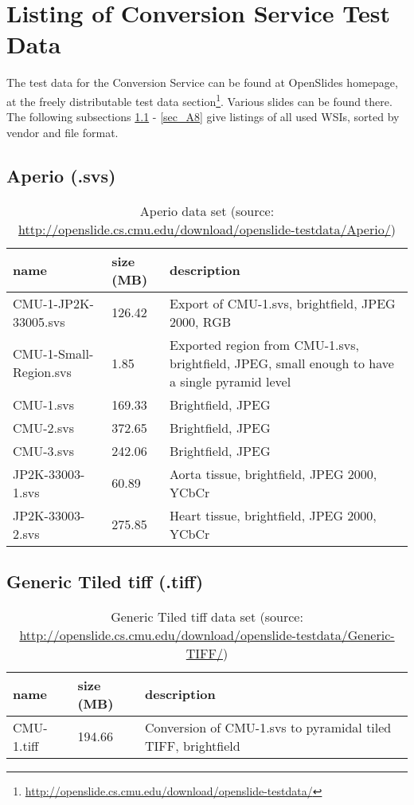 \chapter{Listing of Conversion Service Test Data}

The test data for the Conversion Service can be found at OpenSlides homepage, at the freely distributable test data section\footnote{\url{http://openslide.cs.cmu.edu/download/openslide-testdata/}}. Various slides can be found there. The following subsections \ref{sec_A1} - \ref{sec_A8} give listings of all used WSIs, sorted by vendor and file format.

\section{Aperio (.svs)}
\label{sec_A1}

\begin{table}[H]
	\begin{center}
		\begin{tabular}{| p{4cm} | p{2cm} | p{5cm} |}
			\hline
			\textbf{name} & \textbf{size (MB)} & \textbf{description} \\ \hline
			CMU-1-JP2K-33005.svs & 126.42 & Export of CMU-1.svs, brightfield, JPEG 2000, RGB\\ \hline
			CMU-1-Small-Region.svs & 1.85 & Exported region from CMU-1.svs, brightfield, JPEG, small enough to have a single pyramid level \\ \hline
			CMU-1.svs & 169.33 & Brightfield, JPEG \\ \hline
			CMU-2.svs & 372.65 & Brightfield, JPEG \\ \hline	
			CMU-3.svs & 242.06 & Brightfield, JPEG \\ \hline	
			JP2K-33003-1.svs & 60.89 & Aorta tissue, brightfield, JPEG 2000, YCbCr \\ \hline
			JP2K-33003-2.svs & 275.85 & Heart tissue, brightfield, JPEG 2000, YCbCr  \\ \hline
		\end{tabular}
		\caption{Aperio data set (source: \url{http://openslide.cs.cmu.edu/download/openslide-testdata/Aperio/})}
	\end{center}
\end{table}


\section{Generic Tiled tiff (.tiff)}

\begin{table}[H]
	\begin{center}
		\begin{tabular}{| p{4cm} | p{2cm} | p{5cm} |}
			\hline
			\textbf{name} & \textbf{size (MB)} & \textbf{description} \\ \hline
			CMU-1.tiff & 194.66 & Conversion of CMU-1.svs to pyramidal tiled TIFF, brightfield \\ \hline
		\end{tabular}
		\caption{Generic Tiled tiff data set (source: \url{http://openslide.cs.cmu.edu/download/openslide-testdata/Generic-TIFF/})}
	\end{center}
\end{table}


